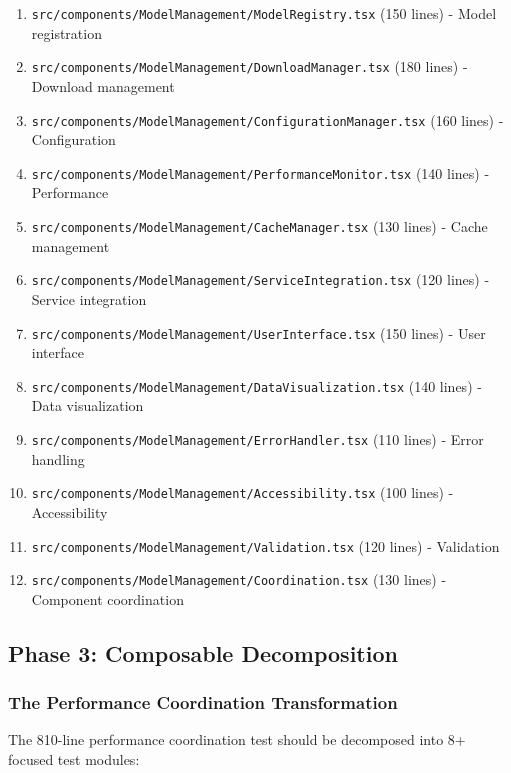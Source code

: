 \documentclass[11pt]{article}
\begin{document}
\begin{enumerate}
\item \texttt{src/components/ModelManagement/ModelRegistry.tsx} (150 lines) - Model registration
\item \texttt{src/components/ModelManagement/DownloadManager.tsx} (180 lines) - Download management
\item \texttt{src/components/ModelManagement/ConfigurationManager.tsx} (160 lines) - Configuration
\item \texttt{src/components/ModelManagement/PerformanceMonitor.tsx} (140 lines) - Performance
\item \texttt{src/components/ModelManagement/CacheManager.tsx} (130 lines) - Cache management
\item \texttt{src/components/ModelManagement/ServiceIntegration.tsx} (120 lines) - Service integration
\item \texttt{src/components/ModelManagement/UserInterface.tsx} (150 lines) - User interface
\item \texttt{src/components/ModelManagement/DataVisualization.tsx} (140 lines) - Data visualization
\item \texttt{src/components/ModelManagement/ErrorHandler.tsx} (110 lines) - Error handling
\item \texttt{src/components/ModelManagement/Accessibility.tsx} (100 lines) - Accessibility
\item \texttt{src/components/ModelManagement/Validation.tsx} (120 lines) - Validation
\item \texttt{src/components/ModelManagement/Coordination.tsx} (130 lines) - Component coordination
\end{enumerate}

\subsection{Phase 3: Composable Decomposition}

\subsubsection{The Performance Coordination Transformation}

The 810-line performance coordination test should be decomposed into 8+ focused test modules:
\end{document}
